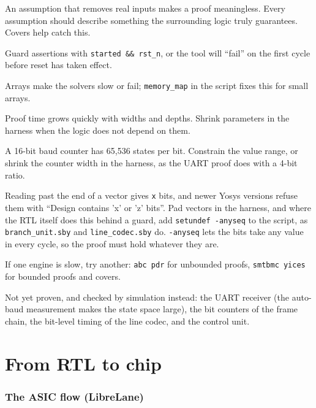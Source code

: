 \documentclass[11pt,a4paper]{article}
\newcommand{\file}[1]{\texttt{#1}}
\begin{document}
\begin{description}[style=nextline,leftmargin=1.5em]
\item[Too-strong assumptions] An assumption that removes real inputs makes a proof meaningless. Every assumption should describe something the surrounding logic truly guarantees. Covers help catch this.
\item[Checking during reset] Guard assertions with \texttt{started \&\& rst\_n}, or the tool will ``fail'' on the first cycle before reset has taken effect.
\item[Memories] Arrays make the solvers slow or fail; \texttt{memory\_map} in the script fixes this for small arrays.
\item[Large parameters] Proof time grows quickly with widths and depths. Shrink parameters in the harness when the logic does not depend on them.
\item[Long counters] A 16-bit baud counter has 65,536 states per bit. Constrain the value range, or shrink the counter width in the harness, as the UART proof does with a 4-bit ratio.
\item[Undefined bits] Reading past the end of a vector gives \texttt{x} bits, and newer Yosys versions refuse them with ``Design contains 'x' or 'z' bits''. Pad vectors in the harness, and where the RTL itself does this behind a guard, add \texttt{setundef -anyseq} to the script, as \file{branch\_unit.sby} and \file{line\_codec.sby} do. \texttt{-anyseq} lets the bits take any value in every cycle, so the proof must hold whatever they are.
\item[Solver differences] If one engine is slow, try another: \texttt{abc pdr} for unbounded proofs, \texttt{smtbmc yices} for bounded proofs and covers.
\end{description}

Not yet proven, and checked by simulation instead: the UART receiver (the auto-baud measurement makes the state space large), the bit counters of the frame chain, the bit-level timing of the line codec, and the control unit.

\part{From RTL to chip}\label{part:asic}

\section{The ASIC flow (LibreLane)}
\end{document}
